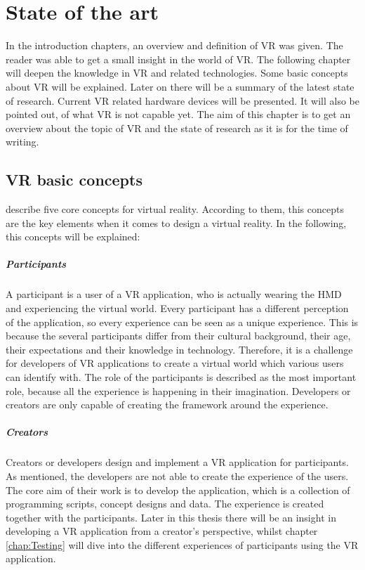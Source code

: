\chapter{State of the art}
In the introduction chapters, an overview and definition of VR was given. The reader was able to get a small insight in the world of VR. The following chapter will deepen the knowledge in VR and related technologies. Some basic concepts about VR will be explained. Later on there will be a summary of the latest state of research. Current VR related hardware devices will be presented. It will also be pointed out, of what VR is not capable yet. The aim of this chapter is to get an overview about the topic of VR and the state of research as it is for the time of writing.
\section{VR basic concepts}
\cite{Sherman.2019} describe five core concepts for virtual reality.  According to them, this concepts are the key elements when it comes to design a virtual reality. In the following, this concepts will be explained:
\paragraph{Participants} A participant is a user of a VR application, who is actually wearing the HMD and experiencing the virtual world. Every participant has a different perception of the application, so every experience can be seen as a unique experience. This is because the several participants differ from their cultural background, their age, their expectations and their knowledge in technology. Therefore, it is a challenge for developers of VR applications to create a virtual world which various users can identify with. The role of the participants is described as the most important role, because all the experience is happening in their imagination. Developers or creators are only capable of creating the framework around the experience.
\paragraph{Creators} Creators or developers design and implement a VR application for participants. As mentioned, the developers are not able to create the experience of the users. The core aim of their work is to develop the application, which is a collection of programming scripts, concept designs and data. The experience is created together with the participants. Later in this thesis there will be an insight in developing a VR application from a creator's perspective, whilst chapter \ref{chap:Testing} will dive into the different experiences of participants using the VR application.
